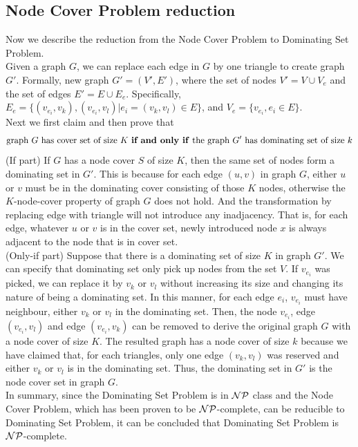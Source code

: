 \documentclass[11pt,a4paper]{article}
\newcommand{\htab}{\hspace*{0.63cm}}
\newcommand{\pg}{\\[0.3cm]}
\begin{document}
\subsection{Node Cover Problem reduction}
\htab Now we describe the reduction from the Node Cover Problem to Dominating Set Problem. \\
\htab Given a graph $G$, we can replace each edge in $G$ by one triangle to create graph $G'$. Formally, new graph $G' = (V',E')$, where the set of nodes $V'= V \cup V_{e}$ and the set of edges $E' = E \cup E_{e}$. Specifically, $E_{e} = \{ (v_{e_{i}}, v_{k}), (v_{e_{i}}, v_{l}) | e_{i} = (v_{k}, v_{l}) \in E\}$, and $V_{e} = \{ v_{e_{i}}, e_{i} \in E\}$. \\
\htab Next we first claim and then prove that 
\begin{align}
    \text{graph $G$ has cover set of size $K$ \textbf{if and only if} the graph $G'$ has dominating set of size $k$}
\end{align}
\htab (If part) If $G$ has a node cover $S$ of size $K$, then the same set of nodes form a dominating set in $G'$. This is because for each edge $(u,v)$ in graph $G$, either $u$ or $v$ must be in the dominating cover consisting of those $K$ nodes, otherwise the $K$-node-cover property of graph $G$ does not hold. And the transformation by replacing edge with triangle will not introduce any inadjacency. That is, for each edge, whatever $u$ or $v$ is in the cover set, newly introduced node $x$ is always adjacent to the node that is in cover set. \\
\htab (Only-if part) Suppose that there is a dominating set of size $K$ in graph $G'$. We can specify that dominating set only pick up nodes from the set $V$. If $v_{e_{i}}$ was picked, we can replace it by $v_{k}$ or $v_{l}$ without increasing its size and changing its nature of being a dominating set. In this manner, for each edge $e_{i}$, $v_{e_{i}}$ must have neighbour, either $v_{k}$ or $v_{l}$ in the dominating set. Then, the node $v_{e_{i}}$, edge $(v_{e_{i}}, v_{l})$ and edge $(v_{e_{i}}, v_{k})$ can be removed to derive the original graph $G$ with a node cover of size $K$. The resulted graph has a node cover of size $k$ because we have claimed that, for each triangles, only one edge $(v_{k}, v_{l})$ was reserved and either $v_{k}$ or $v_{l}$ is in the dominating set. Thus, the dominating set in $G'$ is the node cover set in graph $G$. \pg
\htab In summary, since the Dominating Set Problem is in $\mathcal{NP}$ class and the Node Cover Problem, which has been proven to be $\mathcal{NP}$-complete, can be reducible to Dominating Set Problem, it can be concluded that Dominating Set Problem is $\mathcal{NP}$-complete.
\end{document}
